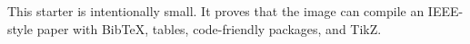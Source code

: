This starter is intentionally small. It proves that the image can compile an
IEEE-style paper with BibTeX, tables, code-friendly packages, and TikZ.
